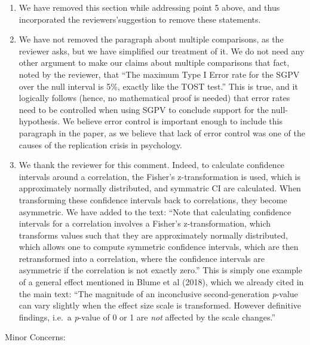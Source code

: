 \documentclass[man]{apa6}
\begin{document}
\begin{enumerate}
\def\labelenumi{\arabic{enumi}.}
\setcounter{enumi}{5}
\item
  We have removed this section while addressing point 5 above, and thus
  incorporated the reviewers'suggestion to remove these statements.
\item
  We have not removed the paragraph about multiple comparisons, as the
  reviewer asks, but we have simplified our treatment of it. We do not
  need any other argument to make our claims about multiple comparisons
  that fact, noted by the reviewer, that \enquote{The maximum Type I
  Error rate for the SGPV over the null interval is 5\%, exactly like
  the TOST test.} This is true, and it logically follows (hence, no
  mathematical proof is needed) that error rates need to be controlled
  when using SGPV to conclude support for the null-hypothesis. We
  believe error control is important enough to include this paragraph in
  the paper, as we believe that lack of error control was one of the
  causes of the replication crisis in psychology.
\item
  We thank the reviewer for this comment. Indeed, to calculate
  confidence intervals around a correlation, the Fisher's
  z-transformation is used, which is approximately normally distributed,
  and symmatric CI are calculated. When transforming these confidence
  intervals back to correlations, they become asymmetric. We have added
  to the text: \enquote{Note that calculating confidence intervals for a
  correlation involves a Fisher's z-transformation, which transforms
  values such that they are approximately normally distributed, which
  allows one to compute symmetric confidence intervals, which are then
  retransformed into a correlation, where the confidence intervals are
  asymmetric if the correlation is not exactly zero.} This is simply one
  example of a general effect mentioned in Blume et al (2018), which we
  already cited in the main text: \enquote{The magnitude of an
  inconclusive second-generation \emph{p}-value can vary slightly when
  the effect size scale is transformed. However definitive findings,
  i.e.~a \emph{p}-value of 0 or 1 are \emph{not} affected by the scale
  changes.}
\end{enumerate}

Minor Concerns:
\end{document}

